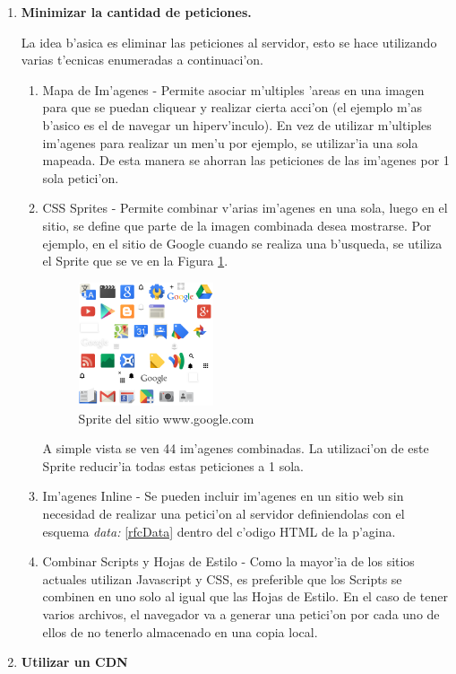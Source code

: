 \begin{enumerate}

\item \textbf{Minimizar la cantidad de peticiones.}

La idea b'asica es eliminar las peticiones al servidor, esto se hace utilizando varias t'ecnicas enumeradas a continuaci'on.

	\begin{enumerate}
	\item Mapa de Im'agenes - Permite asociar m'ultiples 'areas en una imagen para que se puedan cliquear y realizar cierta acci'on (el ejemplo m'as b'asico es el de navegar un hiperv'inculo). En vez de utilizar m'ultiples im'agenes para realizar un men'u por ejemplo, se utilizar'ia una sola mapeada. De esta manera se ahorran las peticiones de las im'agenes por 1 sola petici'on.
	\item CSS Sprites - Permite combinar v'arias im'agenes en una sola, luego en el sitio, se define que parte de la imagen combinada desea mostrarse. Por ejemplo, en el sitio de Google cuando se realiza una b'usqueda, se utiliza el Sprite que se ve en la Figura \ref{css_sprites}.
		\begin{figure}[htbp]
		\begin{center}
			\includegraphics[width=150px]{img/css_sprites}
			\caption{\small Sprite del sitio www.google.com}
		\end{center}
		\label{css_sprites}
		\end{figure}

	A simple vista se ven 44 im'agenes combinadas. La utilizaci'on de este Sprite reducir'ia todas estas peticiones a 1 sola.
	\item Im'agenes Inline - Se pueden incluir im'agenes en un sitio web sin necesidad de realizar una petici'on al servidor definiendolas con el esquema \textit{data:} \ref{rfcData} dentro del c'odigo HTML de la p'agina.
	\item Combinar Scripts y Hojas de Estilo - Como la mayor'ia de los sitios actuales utilizan Javascript y CSS, es preferible que los Scripts se combinen en uno solo al igual que las Hojas de Estilo. En el caso de tener varios archivos, el navegador va a generar una petici'on por cada uno de ellos de no tenerlo almacenado en una copia local.
	\end{enumerate}
\item \textbf{Utilizar un CDN}


\end{enumerate}

